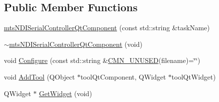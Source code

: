 \subsection*{Public Member Functions}
\begin{DoxyCompactItemize}
\item 
\hyperlink{classmts_n_d_i_serial_controller_qt_component_a6a049977126a130c6604509fc8da67bc}{mts\-N\-D\-I\-Serial\-Controller\-Qt\-Component} (const std\-::string \&task\-Name)
\item 
\hyperlink{classmts_n_d_i_serial_controller_qt_component_aa991fd9da8f3cc9f3c43306da82600ba}{$\sim$mts\-N\-D\-I\-Serial\-Controller\-Qt\-Component} (void)
\item 
void \hyperlink{classmts_n_d_i_serial_controller_qt_component_a27905059182decb564adc1b2fa904fe3}{Configure} (const std\-::string \&\hyperlink{cmn_portability_8h_a021894e2626935fa2305434b1e893ff6}{C\-M\-N\-\_\-\-U\-N\-U\-S\-E\-D}(filename)=\char`\"{}\char`\"{})
\item 
void \hyperlink{classmts_n_d_i_serial_controller_qt_component_a1da2ca165f8b294882a892d0ae0c4c4b}{Add\-Tool} (Q\-Object $\ast$tool\-Qt\-Component, Q\-Widget $\ast$tool\-Qt\-Widget)
\item 
Q\-Widget $\ast$ \hyperlink{classmts_n_d_i_serial_controller_qt_component_aa017ceba5024cff197f3a61c75ea4c4e}{Get\-Widget} (void)
\end{DoxyCompactItemize}
